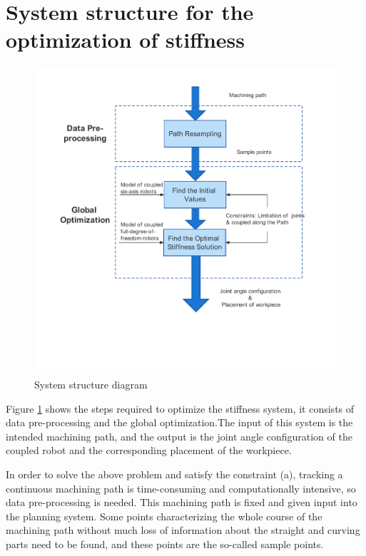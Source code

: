 \section{System structure for the optimization of stiffness} \label{sec:Introduction:System structure}
\begin{figure}[h!]
	\centering
        \setlength{\abovecaptionskip}{-3cm} 
	\includegraphics[width=\textwidth]{03_images/pipeline_full.pdf}
	\caption{System structure diagram}
	\label{fig:Introduction:pipeline}
\end{figure}
Figure \ref{fig:Introduction:pipeline} shows the steps required to optimize the stiffness system, it consists of data pre-processing and the global optimization.The input of this system is the intended machining path, and the output is the joint angle configuration of the coupled robot and the corresponding placement of the workpiece.\par
In order to solve the above problem and satisfy the constraint (a), tracking a continuous machining path is time-consuming and computationally intensive, so data pre-processing is needed. This machining path is fixed and given input into the planning system. Some points characterizing the whole course of the machining path without much loss of information about the straight and curving parts need to be found, and these points are the so-called sample points. \par
